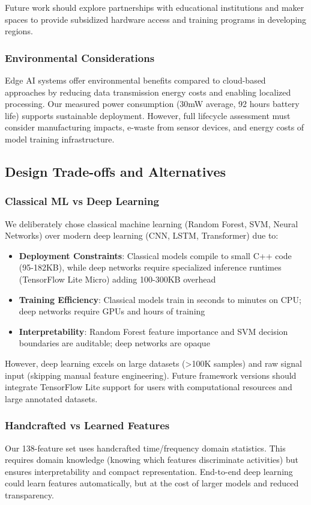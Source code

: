 Future work should explore partnerships with educational institutions and maker spaces to provide subsidized hardware access and training programs in developing regions.

\subsubsection{Environmental Considerations}
Edge AI systems offer environmental benefits compared to cloud-based approaches by reducing data transmission energy costs and enabling localized processing. Our measured power consumption (30mW average, 92 hours battery life) supports sustainable deployment. However, full lifecycle assessment must consider manufacturing impacts, e-waste from sensor devices, and energy costs of model training infrastructure.

\subsection{Design Trade-offs and Alternatives}

\subsubsection{Classical ML vs Deep Learning}
We deliberately chose classical machine learning (Random Forest, SVM, Neural Networks) over modern deep learning (CNN, LSTM, Transformer) due to:
\begin{itemize}
    \item \textbf{Deployment Constraints}: Classical models compile to small C++ code (95-182KB), while deep networks require specialized inference runtimes (TensorFlow Lite Micro) adding 100-300KB overhead
    \item \textbf{Training Efficiency}: Classical models train in seconds to minutes on CPU; deep networks require GPUs and hours of training
    \item \textbf{Interpretability}: Random Forest feature importance and SVM decision boundaries are auditable; deep networks are opaque
\end{itemize}

However, deep learning excels on large datasets (>100K samples) and raw signal input (skipping manual feature engineering). Future framework versions should integrate TensorFlow Lite support for users with computational resources and large annotated datasets.

\subsubsection{Handcrafted vs Learned Features}
Our 138-feature set uses handcrafted time/frequency domain statistics. This requires domain knowledge (knowing which features discriminate activities) but ensures interpretability and compact representation. End-to-end deep learning could learn features automatically, but at the cost of larger models and reduced transparency.

